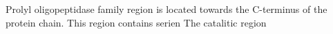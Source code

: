 Prolyl oligopeptidase family region is located towards the C-terminus of the protein chain. This region contains serien The catalitic region 